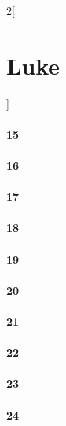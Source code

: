 \documentclass{book}
\begin{document}
\begin{multicols}{2}[\part{Luke}]
\subsection*{15}
\subsection*{16}
\subsection*{17}
\subsection*{18}
\subsection*{19}
\subsection*{20}
\subsection*{21}
\subsection*{22}
\subsection*{23}
\subsection*{24}
\end{multicols}
\end{document}
